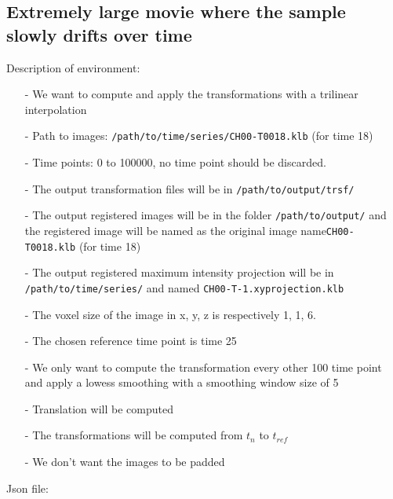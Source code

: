 \documentclass[10pt,a4paper]{article}
\begin{document}
\subsection{Extremely large movie where the sample slowly drifts over time}
Description of environment:
\begin{itemize}
\item[-] We want to compute and apply the transformations with a trilinear interpolation
\item[-] Path to images: \texttt{/path/to/time/series/CH00-T0018.klb} (for time 18)
\item[-] Time points: 0 to 100000, no time point should be discarded.
\item[-] The output transformation files will be in \texttt{/path/to/output/trsf/}
\item[-] The output registered images will be in the folder \texttt{/path/to/output/} and the registered image will be named as the original image name\texttt{CH00-T0018.klb} (for time 18)
\item[-] The output registered maximum intensity projection will be in \texttt{/path/to/time/series/} and named \texttt{CH00-T-1.xyprojection.klb}
\item[-] The voxel size of the image in x, y, z is respectively 1, 1, 6.
\item[-] The chosen reference time point is time 25
\item[-] We only want to compute the transformation every other 100 time point and apply a lowess smoothing with a smoothing window size of 5
\item[-] Translation will be computed
\item[-] The transformations will be computed from $t_n$ to $t_{ref}$
\item[-] We don't want the images to be padded
\end{itemize}
Json file:
\end{document}
